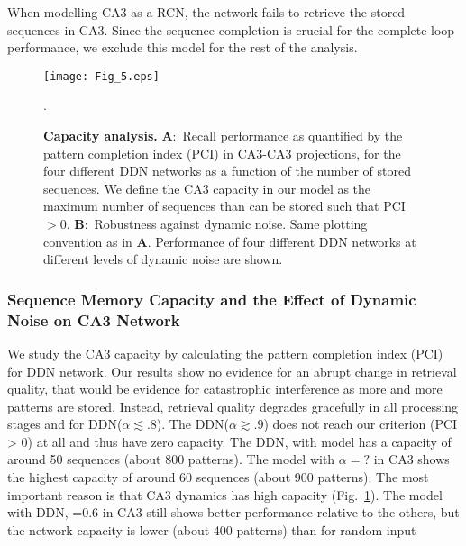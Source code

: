 \documentclass[utf8]{frontiersSCNS} %
\begin{document}
When modelling CA3 as a RCN, the network fails to retrieve the stored sequences in CA3. Since the sequence completion is crucial for the complete loop performance, we exclude this model for the rest of the analysis.


\begin{figure}[!htb]
\centering\texttt{[image: Fig\_5.eps]}
\caption{\textbf{Capacity analysis.} 
\textbf{A}:~Recall performance as quantified by the pattern completion index (PCI) in CA3-CA3 projections, for the four different DDN networks as a function of the number of stored sequences. 
We define the CA3 capacity in our model as the maximum number of sequences than can be stored such that PCI $> 0$. \textbf{B}:~Robustness against dynamic noise.
Same plotting convention as in \textbf{A}.
Performance of four different DDN networks at different levels of dynamic noise are shown.
}.   
\label{Fig_5}
\end{figure}

\subsubsection{Sequence Memory Capacity and the Effect of Dynamic Noise on CA3 Network}

We study the CA3 capacity by calculating the pattern completion index (PCI) for DDN network. Our results show no evidence for an abrupt change in retrieval quality, that would be evidence for catastrophic interference as more and more patterns are stored. Instead, retrieval quality degrades gracefully in all processing stages and for DDN($\alpha \lesssim .8$).
The DDN($\alpha \gtrsim .9$) does not reach our criterion (PCI > 0) at all and thus have zero capacity. The DDN, with  model has a capacity of around 50 sequences (about 800 patterns). The model with $\alpha = ?$ in CA3 shows the highest capacity of around 60 sequences (about 900 patterns). The most important reason is that CA3 dynamics has high capacity (Fig.~\ref{Fig_5}).  
The model with DDN, =0.6 in CA3 still shows better performance relative to the others, but the network capacity is lower (about 400 patterns) than for random input
\end{document}
